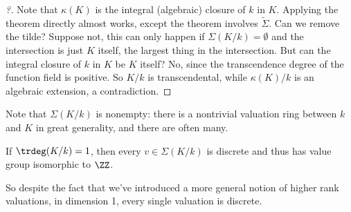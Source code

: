 \begin{proof}[?]

Note that \(\kappa(K)\) is the integral (algebraic) closure of \(k\) in
\(K\). Applying the theorem directly almost works, except the theorem
involves \(\tilde \Sigma\). Can we remove the tilde? Suppose not, this
can only happen if \(\Sigma(K/k) = \emptyset\) and the intersection is
just \(K\) itself, the largest thing in the intersection. But can the
integral closure of \(k\) in \(K\) be \(K\) itself? No, since the
transcendence degree of the function field is positive. So \(K/k\) is
transcendental, while \(\kappa(K) / k\) is an algebraic extension, a
contradiction.

\end{proof}

\begin{remark}

Note that \(\Sigma(K/k)\) is nonempty: there is a nontrivial valuation
ring between \(k\) and \(K\) in great generality, and there are often
many.

\end{remark}

\begin{claim}[Key]

If \(\trdeg(K/k) = 1\), then every \(v\in \Sigma(K/k)\) is discrete and
thus has value group isomorphic to \(\ZZ\).

\end{claim}

So despite the fact that we've introduced a more general notion of
higher rank valuations, in dimension 1, every single valuation is
discrete.

